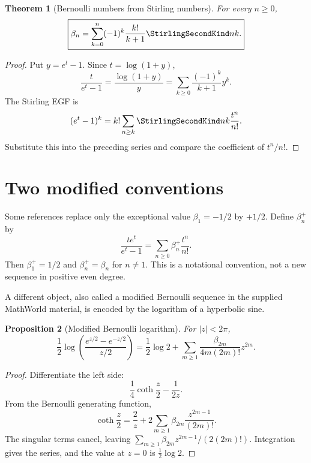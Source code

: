 \documentclass[11pt,a4paper,oneside,openany]{book}
\newtheorem{theorem}{Theorem}[chapter]
\newtheorem{proposition}[theorem]{Proposition}
\theoremstyle{definition}
\theoremstyle{remark}
\begin{document}
\begin{theorem}[Bernoulli numbers from Stirling numbers]\label{thm:new-bernoulli-stirling}
For every $n\ge0$,
\begin{equation}\label{eq:new-bernoulli-stirling}
 \boxed{\displaystyle
 \beta_n=\sum_{k=0}^n(-1)^k\frac{k!}{k+1}\StirlingSecondKind nk.}
\end{equation}
\end{theorem}

\begin{proof}
Put $y=e^t-1$.  Since $t=\log(1+y)$,
\[
 \frac{t}{e^t-1}=\frac{\log(1+y)}{y}
 =\sum_{k\ge0}\frac{(-1)^k}{k+1}y^k.
\]
The Stirling EGF is
\[
 (e^t-1)^k=k!\sum_{n\ge k}\StirlingSecondKind nk\frac{t^n}{n!}.
\]
Substitute this into the preceding series and compare the coefficient of
$t^n/n!$.
\end{proof}

\section{Two modified conventions}

Some references replace only the exceptional value $\beta_1=-1/2$ by
$+1/2$.  Define $\beta_n^+$ by
\begin{equation}\label{eq:new-plus-bernoulli}
 \frac{te^t}{e^t-1}=\sum_{n\ge0}\beta_n^+\frac{t^n}{n!}.
\end{equation}
Then $\beta_1^+=1/2$ and $\beta_n^+=\beta_n$ for $n\ne1$.  This is a
notational convention, not a new sequence in positive even degree.

A different object, also called a modified Bernoulli sequence in the supplied
MathWorld material, is encoded by the logarithm of a hyperbolic sine.

\begin{proposition}[Modified Bernoulli logarithm]\label{prop:new-modified-bernoulli}
For $|z|<2\pi$,
\begin{equation}\label{eq:new-modified-bernoulli}
 \frac12\log\left(\frac{e^{z/2}-e^{-z/2}}{z/2}\right)
 =\frac12\log2+
 \sum_{m\ge1}\frac{\beta_{2m}}{4m(2m)!}z^{2m}.
\end{equation}
\end{proposition}

\begin{proof}
Differentiate the left side:
\[
 \frac14\coth\frac z2-\frac1{2z}.
\]
From the Bernoulli generating function,
\[
 \coth\frac z2=\frac2z+
 2\sum_{m\ge1}\beta_{2m}\frac{z^{2m-1}}{(2m)!}.
\]
The singular terms cancel, leaving
$\sum_{m\ge1}\beta_{2m}z^{2m-1}/(2(2m)!)$.  Integration gives the series,
and the value at $z=0$ is $\frac12\log2$.
\end{proof}
\end{document}
